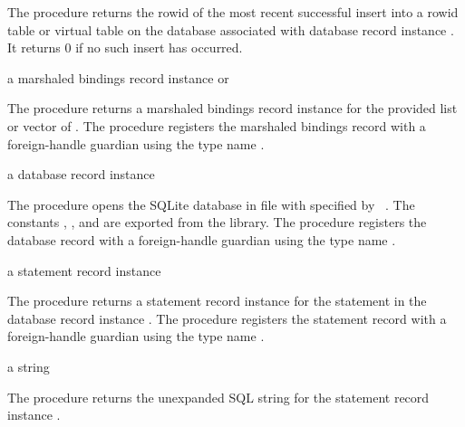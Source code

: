 The  procedure returns the rowid of the
most recent successful insert into a rowid table or virtual table on
the database associated with database record instance . It
returns 0 if no such insert has occurred.

\begin{procedure}
\end{procedure}
\returns{} a marshaled bindings record instance or 

The  procedure returns a marshaled
bindings record instance for the provided list or vector of
. The  procedure registers
the marshaled bindings record with a foreign-handle guardian using the
type name .

\begin{procedure}
\end{procedure}
\returns{} a database record instance

The  procedure opens the SQLite database in file
 with  specified by
~\cite{sqlite}. The constants
, , and
 are exported from the 
library.
The  procedure registers the database record
with a foreign-handle guardian using the type name .

\begin{procedure}
\end{procedure}
\returns{} a statement record instance

The  procedure returns a statement record
instance for the  statement in the database record instance
.
The  procedure registers the statement record
with a foreign-handle guardian using the type name .

\begin{procedure}
\end{procedure}
\returns{} a string

The  procedure returns the unexpanded SQL string for
the statement record instance .

